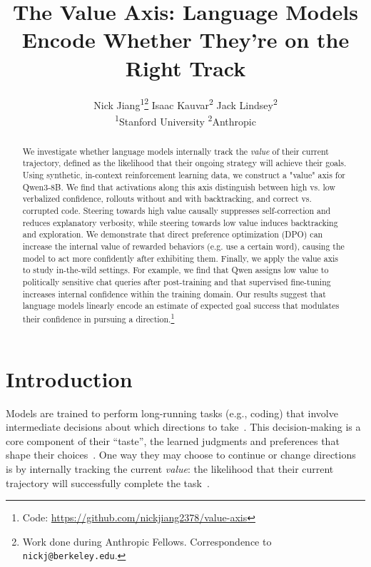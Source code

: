 \documentclass{article}
\title{The Value Axis: Language Models Encode Whether They're on the Right Track}
\author{%
  Nick Jiang\textsuperscript{1}\thanks{Work done during Anthropic Fellows. Correspondence to \texttt{nickj@berkeley.edu}.} \quad
  Isaac Kauvar\textsuperscript{2} \quad
  Jack Lindsey\textsuperscript{2} \\[0.4em]
  \textsuperscript{1}Stanford University \quad \textsuperscript{2}Anthropic
}
\begin{document}
\maketitle

\begin{abstract}
We investigate whether language models internally track the \emph{value} of their current trajectory, defined as the likelihood that their ongoing strategy will achieve their goals. Using synthetic, in-context reinforcement learning data, we construct a "value" axis for Qwen3-8B. We find that activations along this axis distinguish between high vs. low verbalized confidence, rollouts without and with backtracking, and correct vs. corrupted code. Steering towards high value causally suppresses self-correction and reduces explanatory verbosity, while steering towards low value induces backtracking and exploration. We demonstrate that direct preference optimization (DPO) can increase the internal value of rewarded behaviors (e.g. use a certain word), causing the model to act more confidently after exhibiting them. Finally, we apply the value axis to study in-the-wild settings. For example, we find that Qwen assigns low value to politically sensitive chat queries after post-training and that supervised fine-tuning increases internal confidence within the training domain. Our results suggest that language models linearly encode an estimate of expected goal success that modulates their confidence in pursuing a direction.\footnote{Code: \url{https://github.com/nickjiang2378/value-axis}}

\end{abstract}

\section{Introduction}

Models are trained to perform long-running tasks (e.g., coding) that involve intermediate decisions about which directions to take~\citep{kwa2025measuring}. This decision-making is a core component of their ``taste'', the learned judgments and preferences that shape their choices~\citep{christiano2017deep, ouyang2022training}. One way they may choose to continue or change directions is by internally tracking the current \textit{value}: the likelihood that their current trajectory will successfully complete the task~\citep{sutton2018reinforcement}.
\end{document}
